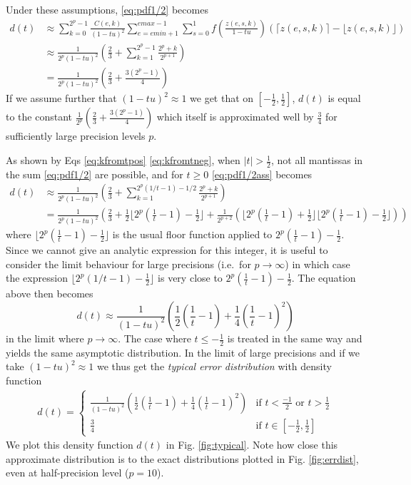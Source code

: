 \documentclass[10pt,a4paper]{article}
\theoremstyle{plain}
\theoremstyle{definition}
\newcommand{\ie}{i.e.\ }
\newcommand{\ceil}[1]{\lceil #1 \rceil}
\newcommand{\floor}[1]{\lfloor #1 \rfloor}
\newcommand{\absv}[1]{\vert #1\vert}
\begin{document}
Under these assumptions, \eqref{eq:pdf1/2} becomes
\begin{align}
d(t)&\approx\sum_{k=0}^{2^p-1}\frac{C(e,k)}{(1-tu)^2}\sum_{e=emin+1}^{emax-1}\sum_{s=0}^1 f\left(\frac{z(e,s,k)}{1-tu}\right)(\ceil{z(e,s,k)}-\floor{z(e,s,k)})\nonumber
\\
&\approx\frac{1}{2^p(1-tu)^2}\left(\frac{2}{3}+\sum_{k=1}^{2^p-1}\frac{2^p+k}{2^{p+1}}\right)\nonumber
\\
&=\frac{1}{2^p(1-tu)^2}\left(\frac{2}{3}+\frac{3(2^{p}-1)}{4}\right)\label{eq:pdf1/2ass}
\end{align}
If we assume further that $(1-tu)^2\approx 1$ we get that on $\left[-\frac{1}{2},\frac{1}{2}\right]$, $d(t)$ is equal to the constant $\frac{1}{2^p}\left(\frac{2}{3}+\frac{3(2^{p}-1)}{4}\right)$ which itself is approximated well by $\frac{3}{4}$ for sufficiently large precision levels $p$.

As shown by Eqs \eqref{eq:kfromtpos} \eqref{eq:kfromtneg}, when $\absv{t}>\frac{1}{2}$, not all mantissas in the sum \eqref{eq:pdf1/2} are possible, and for $t\geq 0$ \eqref{eq:pdf1/2ass} becomes 
\begin{align*}
d(t)&\approx\frac{1}{2^p(1-tu)^2}\left(\frac{2}{3}+\sum_{k=1}^{2^p(1/t-1)-1/2}\frac{2^p+k}{2^{p+1}}\right)
\\
&=\frac{1}{2^p(1-tu)^2}\left(\frac{2}{3}+\frac{1}{2}\floor{2^p(\frac{1}{t}-1)-\frac{1}{2}}+\frac{1}{2^{p+2}}(\floor{2^p(\frac{1}{t}-1)+\frac{1}{2}}\floor{2^p(\frac{1}{t}-1)-\frac{1}{2}})\right)
\end{align*}
where $\floor{2^p(\frac{1}{t}-1)-\frac{1}{2}}$ is the usual floor function applied to $2^p(\frac{1}{t}-1)-\frac{1}{2}$. Since we cannot give an analytic expression for this integer, it is useful to consider the limit behaviour for large precisions (\ie for $p\to\infty$) in which case the expression $\floor{2^p(1/t-1)-\frac{1}{2}}$ is very close to $2^p(\frac{1}{t}-1)-\frac{1}{2}$. The equation above then becomes
\[
d(t)\approx\frac{1}{(1-tu)^2}\left(\frac{1}{2}\left(\frac{1}{t}-1\right)+\frac{1}{4}\left(\frac{1}{t}-1\right)^2\right)
\]
in the limit where $p\to\infty$. The case where $t\leq -\frac{1}{2}$ is treated in the same way and yields the same asymptotic distribution. In the limit of large precisions and if we take $(1-tu)^2\approx 1$ we thus get the \emph{typical error distribution} with density function 
\begin{align}
d(t)=\begin{cases}
\frac{1}{(1-tu)^2}\left(\frac{1}{2}\left(\frac{1}{t}-1\right)+\frac{1}{4}\left(\frac{1}{t}-1\right)^2\right) & \text{if }t< \frac{-1}{2} \text{ or }t>\frac{1}{2}\\
\frac{3}{4}&\text{if }t\in\left[-\frac{1}{2} ,\frac{1}{2}\right]
\end{cases}\label{eq:typicalpdf}
\end{align}
We plot this density function $d(t)$ in Fig. \ref{fig:typical}. Note how close this approximate distribution is to the exact distributions plotted in Fig. \ref{fig:errdist}, even at half-precision level ($p=10$).
\end{document}
